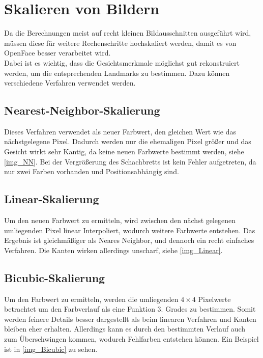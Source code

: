 \section{Skalieren von Bildern}
\label{scale_Algos}
Da die Berechnungen meist auf recht kleinen Bildausschnitten ausgeführt wird, müssen diese für weitere Rechenschritte hochskaliert werden, damit es von OpenFace besser verarbeitet wird.\\
Dabei ist es wichtig, dass die Gesichtsmerkmale möglichst gut rekonstruiert werden, um die entsprechenden Landmarks zu bestimmen. Dazu können verschiedene Verfahren verwendet werden.
\subsection{Nearest-Neighbor-Skalierung}
Dieses Verfahren verwendet als neuer Farbwert, den gleichen Wert wie das nächstgelegene Pixel. Dadurch werden nur die ehemaligen Pixel größer und das Gesicht wirkt sehr Kantig, da keine neuen Farbwerte bestimmt werden, siehe \autoref{img_NN}. Bei der Vergrößerung des Schachbretts ist kein Fehler aufgetreten, da nur zwei Farben vorhanden und Positionsabhängig sind.
\subsection{Linear-Skalierung}
Um den neuen Farbwert zu ermitteln, wird zwischen den nächst gelegenen umliegenden Pixel linear Interpoliert, wodurch weitere Farbwerte entstehen. Das Ergebnis ist gleichmäßiger als Neares Neighbor, und dennoch ein recht einfaches Verfahren. Die Kanten wirken allerdings unscharf, siehe \autoref{img_Linear}.
\subsection{Bicubic-Skalierung}
Um den Farbwert zu ermitteln, werden die umliegenden $4\times 4$ Pixelwerte betrachtet um den Farbverlauf als eine Funktion 3. Grades zu bestimmen. Somit werden feinere Details besser dargestellt als beim linearen Verfahren und Kanten bleiben eher erhalten. Allerdings kann es durch den bestimmten Verlauf auch zum Überschwingen kommen, wodurch Fehlfarben entstehen können. Ein Beispiel ist in \autoref{img_Bicubic} zu sehen.
\cite{wiki_Bicubic}
